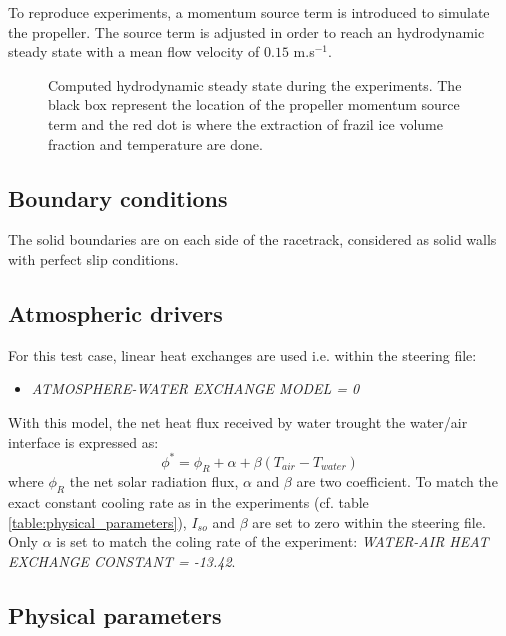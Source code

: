 To reproduce experiments, a momentum source term is introduced to simulate the propeller. The source
term is adjusted in order to reach an hydrodynamic steady state with a mean flow velocity of $0.15$ m.s$^{-1}$.

\begin{figure}[H]
    \begin{center}
    \end{center}
    \caption{Computed hydrodynamic steady state during the experiments. The black box represent the location of the propeller 
momentum source term and the red dot is where the extraction of frazil ice volume fraction and temperature are done.}
    \label{fig:hydro}
\end{figure}

\subsection{Boundary conditions}

The solid boundaries are on each side of the racetrack, considered as solid walls with perfect slip conditions.

\subsection{Atmospheric drivers}

For this test case, linear heat exchanges are used i.e. within the \khione steering file:
\begin{itemize}
	\item\textit{ATMOSPHERE-WATER EXCHANGE MODEL = 0}
\end{itemize}
With this model, the net heat flux received by water trought the water/air interface is expressed as:
\begin{equation}
\phi^* = \phi_R + \alpha + \beta (T_{air} - T_{water})
\end{equation}
where $\phi_R$ the net solar radiation flux, $\alpha$ and $\beta$ are two coefficient. 
To match the exact constant cooling rate as in the experiments (cf. table \ref{table:physical_parameters}), 
$I_{so}$ and $\beta$ are set to zero within the \khione steering file.
Only $\alpha$ is set to match the coling rate of the experiment: \textit{WATER-AIR HEAT EXCHANGE CONSTANT = -13.42}.

\subsection{Physical parameters}

